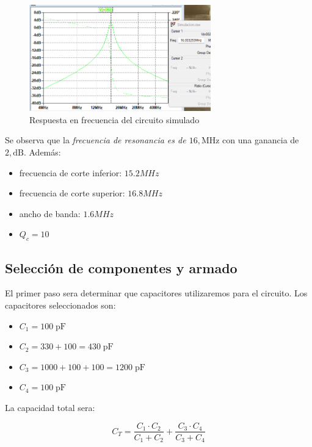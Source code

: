 \begin{figure}[h]
    \centering
    \includegraphics[width=0.7\textwidth]{Imagenes/resultado_circuito.png}
    \caption{Respuesta en frecuencia del circuito simulado}
\end{figure}

Se observa que la \textit{frecuencia de resonancia es de $16 , \text{MHz}$} con una ganancia de $2 , \text{dB}$. Además:

\begin{itemize}
    \item frecuencia de corte inferior: $15.2 MHz$
    \item frecuencia de corte superior: $16.8 MHz$
    \item ancho de banda: $1.6 MHz$
    \item $Q_c = 10$
\end{itemize}

\newpage
\subsection{Selección de componentes y armado}

El primer paso sera determinar que capacitores utilizaremos para el circuito. Los capacitores seleccionados son:

\begin{itemize}
    \item $C_1 = 100\; \text{pF}$
    \item $C_2 = 330 + 100 = 430\; \text{pF}$
    \item $C_3 = 1000 + 100 + 100 =1200\; \text{pF}$
    \item $C_4 = 100\; \text{pF}$
\end{itemize}

La capacidad total sera:

\begin{equation}
    C_T = \frac{C_1 \cdot C_2}{C_1 + C_2} + \frac{C_3 \cdot C_4}{C_3 + C_4} 
\end{equation}


